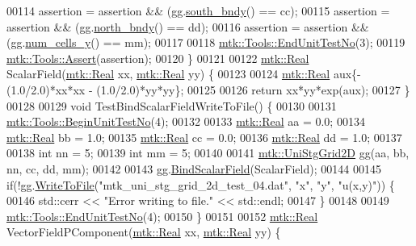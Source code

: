 \begin{DoxyCode}
00114   assertion = assertion && (gg.\hyperlink{classmtk_1_1UniStgGrid2D_a1442eaf219f099d0ebf46a170fdebf92}{south\_bndy}() == cc);
00115   assertion = assertion && (gg.\hyperlink{classmtk_1_1UniStgGrid2D_afe1ead253cdeb5503e0489eba8fd84e2}{north\_bndy}() == dd);
00116   assertion = assertion && (gg.\hyperlink{classmtk_1_1UniStgGrid2D_aed05a801cc9a76dba0ff203cea58a61a}{num\_cells\_y}() == mm);
00117 
00118   \hyperlink{classmtk_1_1Tools_ad8cf0085133dd40c913fe195bc5b9694}{mtk::Tools::EndUnitTestNo}(3);
00119   \hyperlink{classmtk_1_1Tools_aa311fada9255627d06c56b1e4fedce9e}{mtk::Tools::Assert}(assertion);
00120 \}
00121 
00122 \hyperlink{group__c01-roots_gac080bbbf5cbb5502c9f00405f894857d}{mtk::Real} ScalarField(\hyperlink{group__c01-roots_gac080bbbf5cbb5502c9f00405f894857d}{mtk::Real} xx, \hyperlink{group__c01-roots_gac080bbbf5cbb5502c9f00405f894857d}{mtk::Real} yy) \{
00123 
00124   \hyperlink{group__c01-roots_gac080bbbf5cbb5502c9f00405f894857d}{mtk::Real} aux\{-(1.0/2.0)*xx*xx - (1.0/2.0)*yy*yy\};
00125 
00126   \textcolor{keywordflow}{return} xx*yy*exp(aux);
00127 \}
00128 
00129 \textcolor{keywordtype}{void} TestBindScalarFieldWriteToFile() \{
00130 
00131   \hyperlink{classmtk_1_1Tools_a26ee906d28523378522a75e25c3a4e19}{mtk::Tools::BeginUnitTestNo}(4);
00132 
00133   \hyperlink{group__c01-roots_gac080bbbf5cbb5502c9f00405f894857d}{mtk::Real} aa = 0.0;
00134   \hyperlink{group__c01-roots_gac080bbbf5cbb5502c9f00405f894857d}{mtk::Real} bb = 1.0;
00135   \hyperlink{group__c01-roots_gac080bbbf5cbb5502c9f00405f894857d}{mtk::Real} cc = 0.0;
00136   \hyperlink{group__c01-roots_gac080bbbf5cbb5502c9f00405f894857d}{mtk::Real} dd = 1.0;
00137 
00138   \textcolor{keywordtype}{int} nn = 5;
00139   \textcolor{keywordtype}{int} mm = 5;
00140 
00141   \hyperlink{classmtk_1_1UniStgGrid2D}{mtk::UniStgGrid2D} gg(aa, bb, nn, cc, dd, mm);
00142 
00143   gg.\hyperlink{classmtk_1_1UniStgGrid2D_ab6aff36e9f89fba1c1ff4f9914508211}{BindScalarField}(ScalarField);
00144 
00145   \textcolor{keywordflow}{if}(!gg.\hyperlink{classmtk_1_1UniStgGrid2D_a3507e3cf41631e5a5801af8ee6e233b0}{WriteToFile}(\textcolor{stringliteral}{"mtk\_uni\_stg\_grid\_2d\_test\_04.dat"}, \textcolor{stringliteral}{"x"}, \textcolor{stringliteral}{"y"}, \textcolor{stringliteral}{"u(x,y)"})) \{
00146     std::cerr << \textcolor{stringliteral}{"Error writing to file."} << std::endl;
00147   \}
00148 
00149   \hyperlink{classmtk_1_1Tools_ad8cf0085133dd40c913fe195bc5b9694}{mtk::Tools::EndUnitTestNo}(4);
00150 \}
00151 
00152 \hyperlink{group__c01-roots_gac080bbbf5cbb5502c9f00405f894857d}{mtk::Real} VectorFieldPComponent(\hyperlink{group__c01-roots_gac080bbbf5cbb5502c9f00405f894857d}{mtk::Real} xx, \hyperlink{group__c01-roots_gac080bbbf5cbb5502c9f00405f894857d}{mtk::Real} yy) \{

\end{DoxyCode}
